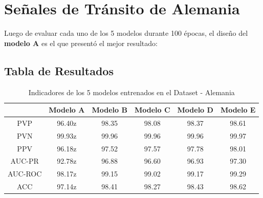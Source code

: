 		
	\section{Señales de Tránsito de Alemania}
		Luego de evaluar cada uno de los 5 modelos durante 100 épocas, el diseño del {\bf modelo A} es el que presentó el mejor resultado:

		\subsection{Tabla de Resultados}


		\begin{table}[H]
			\begin{center}
			\caption{\small{Indicadores de los 5 modelos entrenados en el Dataset - Alemania}}
			\vspace{1.1em}
			\begin{tabular}{c|c|c|c|c|c|}
			\cline{2-6}
			                                 & Modelo A & Modelo B & Modelo C & Modelo D & Modelo E \\ \hline
			\multicolumn{1}{|c|}{PVP}        & 96.40z     & 98.35       & 98.08       & 98.37       & 98.61       \\ \hline
			\multicolumn{1}{|c|}{PVN}        & 99.93z     & 99.96       & 99.96       & 99.96       & 99.97       \\ \hline
			\multicolumn{1}{|c|}{PPV}        & 96.18z     & 97.52       & 97.57       & 97.78       & 98.01      \\ \hline
			\multicolumn{1}{|c|}{AUC-PR}     & 92.78z     & 96.88       & 96.60       & 96.93       & 97.30       \\ \hline
			\multicolumn{1}{|c|}{AUC-ROC}    & 98.17z     & 99.15       & 99.02       & 99.17       & 99.29       \\ \hline
			\multicolumn{1}{|c|}{ACC}        & 97.14z     & 98.41       & 98.27       & 98.43       & 98.62       \\ \hline
			\end{tabular}
			\end{center}
		\end{table}

